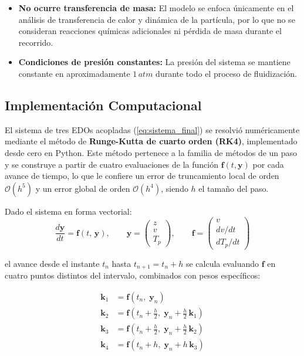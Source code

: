\documentclass[11pt,stdletter,orderfromtodate,sigleft,twoside]{report}
\begin{document}
\begin{itemize}
\item \textbf{No ocurre transferencia de masa:}  
El modelo se enfoca únicamente en el análisis de transferencia de calor y dinámica de la partícula, por lo que no se consideran reacciones químicas adicionales ni pérdida de masa durante el recorrido.

\item \textbf{Condiciones de presión constantes:}  
La presión del sistema se mantiene constante en aproximadamente $1\,atm$ durante todo el proceso de fluidización.
\end{itemize}
\medskip

\subsection{Implementaci\'on Computacional}
El sistema de tres EDOs acopladas (\cref{eq:sistema_final})
se resolvió numéricamente mediante el método de \textbf{Runge-Kutta de cuarto
orden (RK4)}, implementado desde cero en Python. Este método pertenece a la
familia de métodos de un paso y se construye a partir de cuatro evaluaciones
de la función $\mathbf{f}(t, \mathbf{y})$ por cada avance de tiempo, lo que
le confiere un error de truncamiento local de orden $\mathcal{O}(h^5)$ y un
error global de orden $\mathcal{O}(h^4)$, siendo $h$ el tamaño del paso.

Dado el sistema en forma vectorial:
\begin{equation}
    \frac{d\mathbf{y}}{dt} = \mathbf{f}(t,\, \mathbf{y}), \qquad
    \mathbf{y} = \begin{pmatrix} z \\ v \\ T_p \end{pmatrix}, \qquad
    \mathbf{f} = \begin{pmatrix} v \\ dv/dt \\ dT_p/dt \end{pmatrix}
    \label{eq:sistema_vectorial}
\end{equation}

el avance desde el instante $t_n$ hasta $t_{n+1} = t_n + h$ se calcula
evaluando $\mathbf{f}$ en cuatro puntos distintos del intervalo, combinados
con pesos específicos:

\begin{align}
    \mathbf{k}_1 &= \mathbf{f}\!\left(t_n,\; \mathbf{y}_n\right)
    \label{eq:k1}\\
    \mathbf{k}_2 &= \mathbf{f}\!\left(t_n + \tfrac{h}{2},\;
                    \mathbf{y}_n + \tfrac{h}{2}\,\mathbf{k}_1\right)
    \label{eq:k2}\\
    \mathbf{k}_3 &= \mathbf{f}\!\left(t_n + \tfrac{h}{2},\;
                    \mathbf{y}_n + \tfrac{h}{2}\,\mathbf{k}_2\right)
    \label{eq:k3}\\
    \mathbf{k}_4 &= \mathbf{f}\!\left(t_n + h,\;
                    \mathbf{y}_n + h\,\mathbf{k}_3\right)
    \label{eq:k4}
\end{align}
\end{document}
